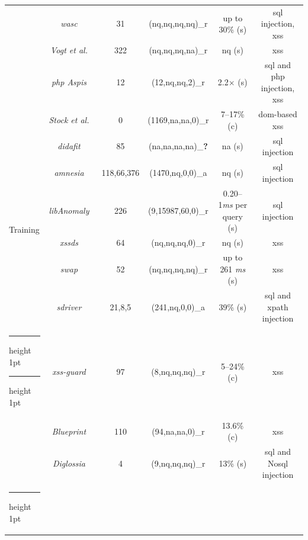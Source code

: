 \documentclass[conference]{IEEEtran}
\makeatletter
\newcommand{\xmark}{\ding{56}}
\newcommand{\thickhline}{%
    \noalign {\ifnum 0=`}\fi \hrule height 1pt
    \futurelet \reserved@a \@xhline
}
\makeatother
\begin{document}
\begin{landscape}
\begin{table}
\begin{threeparttable}
\begin{small}
{\begin{tabular}{l|c|c|cc|c}
  &  	{\it {\sc wasc}}~\cite{NLC07} & 31 & ({\sc nq},{\sc nq},{\sc nq},{\sc nq})\_r & up to 30\% ({\sc s}) & {\sc sql} injection, {\sc xss} \\
	&  	{\it Vogt et al.}~\cite{VFJKKV07} & 322 & ({\sc nq},{\sc nq},{\sc nq},{\sc na})\_r & {\sc nq} ({\sc s}) & {\sc xss} \\
	&  	{\it {\sc php} Aspis}~\cite{PMP11} & 12 & (12,{\sc nq},{\sc nq},2)\_r & 2.2$\times$ ({\sc s}) & {\sc sql} and {\sc php} injection, {\sc xss} \\
	& 	{\it Stock et al.}~\cite{SLMS14} & 0 & (1169,{\sc na},{\sc na},0)\_r & 7--17\% ({\sc c}) & {\sc dom}-based {\sc xss} \\
	\hline 
  \multirow{6}{*}{Training}
  &   {\it {\sc didafit}}~\cite{LLW02} & 85 & ({\sc na},{\sc na},{\sc na},{\sc na})\_{\bf ?} & {\sc na} ({\sc s}) & {\sc sql} injection \\
	&   {\it {\sc amnesia}}~\cite{HO05,HO06,HO05b} & 118,66,376 & (1470,{\sc nq},0,0)\_a & {\sc nq} ({\sc s}) & {\sc sql} injection \\ 
	&   {\it libAnomaly}~\cite{VMV05} & 226 & (9,15987,60,0)\_r & 0.20--1{\it ms} per query ({\sc s}) & {\sc sql} injection \\
	& 	{\it {\sc xssds}}~\cite{JEP08} & 64 & ({\sc nq},{\sc nq},{\sc nq},0)\_r & {\sc nq} ({\sc s}) & {\sc xss} \\
  & 	{\it {\sc swap}}~\cite{WPLKK09} & 52 & ({\sc nq},{\sc nq},{\sc nq},{\sc nq})\_r & up to 261 {\it ms} ({\sc s}) & {\sc xss} \\ 
	& 	{\it {\sc sd}river}~\cite{MS09,MKS09,MKLS11} & 21,8,5 & (241,{\sc nq},0,0)\_a & 39\% ({\sc s}) & {\sc sql} and {\sc xp}ath injection \\
  \thickhline
  \thickhline
  \multirow{3}{*}{Hybrid}
  &   {\it {\sc xss-guard}}~\cite{BV08} & 97 & (8,{\sc nq},{\sc nq},{\sc nq})\_r & 5--24\% ({\sc c}) & {\sc xss} \\
  &   {\it Blueprint}~\cite{LV09} & 110 & (94,{\sc na},{\sc na},0)\_r & 13.6\% ({\sc c}) & {\sc xss} \\
  &   {\it Diglossia}~\cite{SMS13} & 4 & (9,{\sc nq},{\sc nq},{\sc nq})\_r & 13\% ({\sc s}) & {\sc sql} and No{\sc sql} injection \\
	\thickhline
    \end{tabular}}
    \begin{tablenotes}
	\begin{footnotesize}

\end{footnotesize}
\end{tablenotes}
\end{small}
\end{threeparttable}
\end{table}
\end{landscape}
\end{document}
